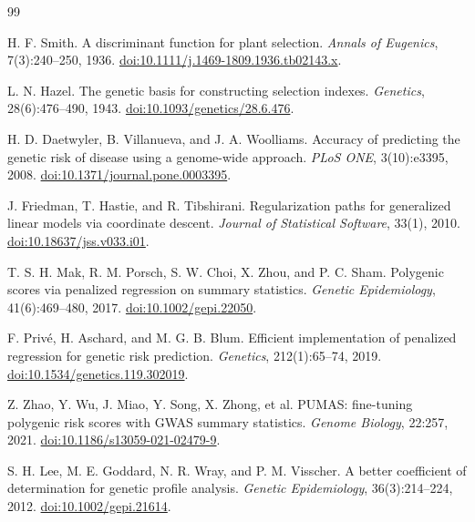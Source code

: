 \documentclass[10pt,a4paper]{article}
\begin{document}
\begin{thebibliography}{99}

H. F. Smith.
\newblock A discriminant function for plant selection.
\newblock \emph{Annals of Eugenics}, 7(3):240--250, 1936.
\newblock \href{https://doi.org/10.1111/j.1469-1809.1936.tb02143.x}
{doi:10.1111/j.1469-1809.1936.tb02143.x}.

L. N. Hazel.
\newblock The genetic basis for constructing selection indexes.
\newblock \emph{Genetics}, 28(6):476--490, 1943.
\newblock \href{https://doi.org/10.1093/genetics/28.6.476}
{doi:10.1093/genetics/28.6.476}.

H. D. Daetwyler, B. Villanueva, and J. A. Woolliams.
\newblock Accuracy of predicting the genetic risk of disease using a
genome-wide approach.
\newblock \emph{PLoS ONE}, 3(10):e3395, 2008.
\newblock \href{https://doi.org/10.1371/journal.pone.0003395}
{doi:10.1371/journal.pone.0003395}.

J. Friedman, T. Hastie, and R. Tibshirani.
\newblock Regularization paths for generalized linear models via coordinate
descent.
\newblock \emph{Journal of Statistical Software}, 33(1), 2010.
\newblock \href{https://doi.org/10.18637/jss.v033.i01}
{doi:10.18637/jss.v033.i01}.

T. S. H. Mak, R. M. Porsch, S. W. Choi, X. Zhou, and P. C. Sham.
\newblock Polygenic scores via penalized regression on summary statistics.
\newblock \emph{Genetic Epidemiology}, 41(6):469--480, 2017.
\newblock \href{https://doi.org/10.1002/gepi.22050}
{doi:10.1002/gepi.22050}.

F. Priv\'e, H. Aschard, and M. G. B. Blum.
\newblock Efficient implementation of penalized regression for genetic risk
prediction.
\newblock \emph{Genetics}, 212(1):65--74, 2019.
\newblock \href{https://doi.org/10.1534/genetics.119.302019}
{doi:10.1534/genetics.119.302019}.

Z. Zhao, Y. Wu, J. Miao, Y. Song, X. Zhong, et al.
\newblock PUMAS: fine-tuning polygenic risk scores with GWAS summary
statistics.
\newblock \emph{Genome Biology}, 22:257, 2021.
\newblock \href{https://doi.org/10.1186/s13059-021-02479-9}
{doi:10.1186/s13059-021-02479-9}.

S. H. Lee, M. E. Goddard, N. R. Wray, and P. M. Visscher.
\newblock A better coefficient of determination for genetic profile analysis.
\newblock \emph{Genetic Epidemiology}, 36(3):214--224, 2012.
\newblock \href{https://doi.org/10.1002/gepi.21614}
{doi:10.1002/gepi.21614}.


\end{thebibliography}
\end{document}
